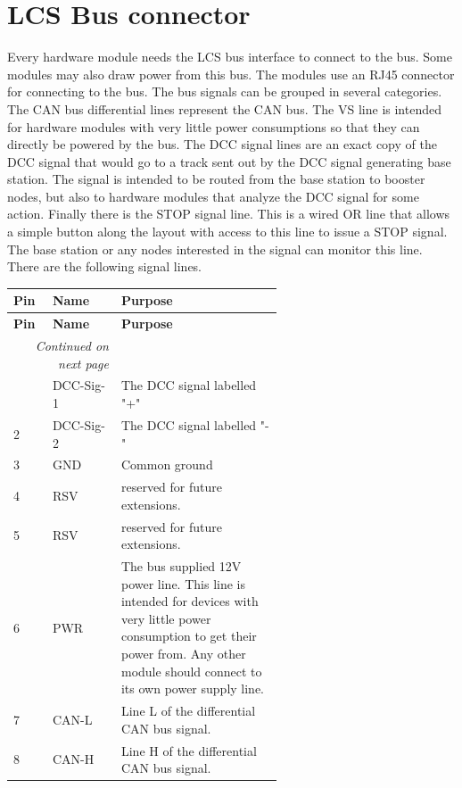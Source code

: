 \section{LCS Bus connector}

Every hardware module needs the LCS bus interface to connect to the bus. Some modules may also draw power from this bus. The modules use an RJ45 connector for connecting to the bus. The bus signals can be grouped in several categories. The CAN bus differential lines represent the CAN bus. The VS line is intended for hardware modules with very little power consumptions so that they can directly be powered by the bus. The DCC signal lines are an exact copy of the DCC signal that would go to a track sent out by the DCC signal generating base station. The signal is intended to be routed from the base station to booster nodes, but also to hardware modules that analyze the DCC signal for some action. Finally there is the STOP signal line. This is a wired OR line that allows a simple button along the layout with access to this line to issue a STOP signal. The base station or any nodes interested in the signal can monitor this line. There are the following signal lines.

\begin{longtable}{@{}|l|l|p{0.6\linewidth}|@{}}
    \toprule
    \textbf{Pin} & \textbf{Name} & \textbf{Purpose} \\
    \midrule
    \endfirsthead
    \toprule
    \textbf{Pin} & \textbf{Name} & \textbf{Purpose} \\
    \midrule
    \endhead
    \midrule
    \multicolumn{2}{r}{\textit{Continued on next page}} \\
    \midrule
    \endfoot
    \bottomrule
    \endlastfoot
    1 & DCC-Sig-1 & The DCC signal labelled "+" \\
    \midrule
    2 & DCC-Sig-2 & The DCC signal labelled "-" \\
    \midrule
    3 & GND & Common ground \\
    \midrule
    4 & RSV & reserved for future extensions. \\
    \midrule
    5 & RSV & reserved for future extensions. \\
    \midrule
    6 & PWR & The bus supplied 12V power line. This line is intended for devices with very little power consumption to get their power from. Any other module should connect to its own power supply line. \\
    \midrule
    7 & CAN-L &  Line L of the differential CAN bus signal. \\
    \midrule
    8 & CAN-H &  Line H of the differential CAN bus signal. \\
\end{longtable}

